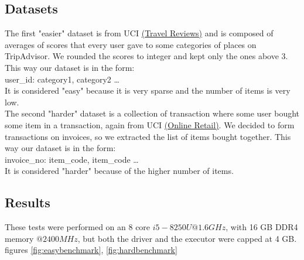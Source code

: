 \documentclass[a4paper]{article}
\begin{document}
	\subsection{Datasets}
	The first "easier" dataset is from UCI \href{https://archive.ics.uci.edu/ml/datasets/Travel+Reviews#}{(Travel Reviews)} and is composed of averages of scores that every user gave to some
	categories of places on TripAdvisor. We rounded the scores to integer and kept only the ones above 3.\\
	This way our dataset is in the form:\\
	user\_id: category1, category2 \ldots\\
	It is considered "easy" because it is very sparse and the number of items is very low.\\

	The second "harder" dataset is a collection of transaction where some user bought some item in a transaction, again from UCI \href{https://archive.ics.uci.edu/ml/datasets/online+retail}{(Online Retail)}.
	We decided to form transactions on invoices, so we extracted the list of items bought together.
	This way our dataset is in the form:\\
	invoice\_no: item\_code, item\_code \ldots\\
	It is considered "harder" because of the higher number of items.\\

	\subsection{Results}
	These tests were performed on an 8 core $i5-8250U @1.6GHz$, with 16 GB DDR4 memory $@2400MHz$, but both the driver and the executor were capped at 4 GB.
	figures \ref{fig:easybenchmark}, \ref{fig:hardbenchmark}
\end{document}
